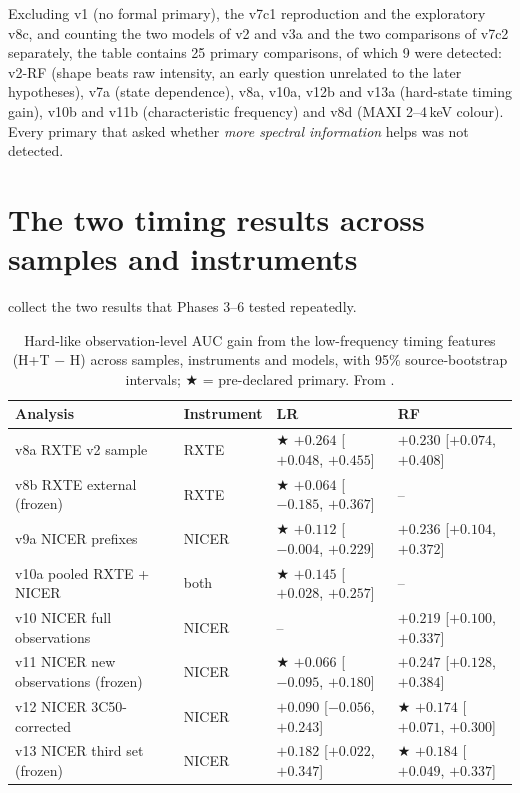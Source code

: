Excluding v1 (no formal primary), the v7c1 reproduction and the exploratory v8c, and counting the two models of v2 and v3a and the
two comparisons of v7c2 separately, the table contains 25 primary comparisons, of which 9 were detected: v2-RF (shape beats raw
intensity, an early question unrelated to the later hypotheses), v7a (state dependence), v8a, v10a, v12b and v13a (hard-state timing
gain), v10b and v11b (characteristic frequency) and v8d (MAXI 2--4\,keV colour). Every primary that asked whether \emph{more spectral
information} helps was not detected.

\section{The two timing results across samples and instruments}\label{sec:synthtiming}
 collect the two results that Phases 3--6 tested repeatedly.

\begin{table}[htbp]
\centering\small
\caption[Hard-state timing gain across versions]{Hard-like observation-level AUC gain from the low-frequency timing features (H+T $-$ H)
across samples, instruments and models, with 95\% source-bootstrap intervals; $\bigstar$ = pre-declared primary. From
.}
\label{tab:synthgain}
\footnotesize\setlength{\tabcolsep}{4pt}
\begin{tabular}{@{}llll@{}}
\toprule
Analysis & Instrument & LR & RF \\
\midrule
v8a RXTE v2 sample & RXTE & $\bigstar$ $+0.264$ [$+0.048$, $+0.455$] & $+0.230$ [$+0.074$, $+0.408$] \\
v8b RXTE external (frozen) & RXTE & $\bigstar$ $+0.064$ [$-0.185$, $+0.367$] & -- \\
v9a NICER prefixes & NICER & $\bigstar$ $+0.112$ [$-0.004$, $+0.229$] & $+0.236$ [$+0.104$, $+0.372$] \\
v10a pooled RXTE + NICER & both & $\bigstar$ $+0.145$ [$+0.028$, $+0.257$] & -- \\
v10 NICER full observations & NICER & -- & $+0.219$ [$+0.100$, $+0.337$] \\
v11 NICER new observations (frozen) & NICER & $\bigstar$ $+0.066$ [$-0.095$, $+0.180$] & $+0.247$ [$+0.128$, $+0.384$] \\
v12 NICER 3C50-corrected & NICER & $+0.090$ [$-0.056$, $+0.243$] & $\bigstar$ $+0.174$ [$+0.071$, $+0.300$] \\
v13 NICER third set (frozen) & NICER & $+0.182$ [$+0.022$, $+0.347$] & $\bigstar$ $+0.184$ [$+0.049$, $+0.337$] \\
\bottomrule
\end{tabular}
\end{table}

